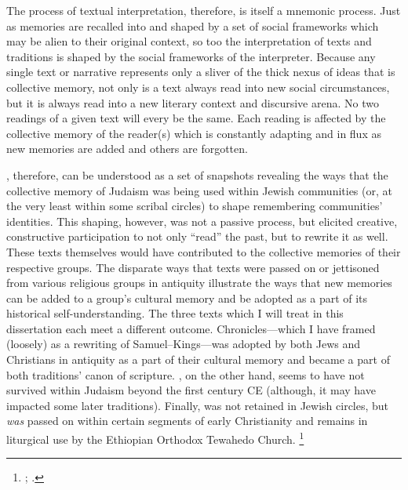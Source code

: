 The process of textual interpretation, therefore, is itself a mnemonic process. Just as memories are recalled into and shaped by a set of social frameworks which may be alien to their original context, so too the interpretation of texts and traditions is shaped by the social frameworks of the interpreter. Because any single text or narrative represents only a sliver of the thick nexus of ideas that is collective memory, not only is a text always read into new social circumstances, but it is always read into a new literary context and discursive arena. No two readings of a given text will every be the same. Each reading is affected by the collective memory of the reader(s) which is constantly adapting and in flux as new memories are added and others are forgotten.  

\RwB, therefore, can be understood as a set of snapshots revealing the ways that the collective memory of \secondtemple Judaism was being used within Jewish communities (or, at the very least within some scribal circles) to shape remembering communities' identities. This shaping, however, was not a passive process, but elicited creative, constructive participation to not only ``read'' the past, but to rewrite it as well. These texts themselves would have contributed to the collective memories of their respective groups. The disparate ways that \rwb texts were passed on or jettisoned from various religious groups in antiquity illustrate the ways that new memories can be added to a group's cultural memory and be adopted as a part of its historical self-understanding. The three texts which I will treat in this dissertation each meet a different outcome. Chronicles---which I have framed (loosely) as a rewriting of Samuel--Kings---was adopted by both Jews and Christians in antiquity as a part of their cultural memory and became a part of both traditions' canon of scripture. \GA, on the other hand, seems to have not survived within Judaism beyond the first century CE (although, it may have impacted some later traditions). Finally, \jub was not retained in Jewish circles, but \emph{was} passed on within certain segments of early Christianity and remains in liturgical use by the Ethiopian Orthodox Tewahedo Church.%
%
\footnote{\Cite{baynes_mason-etal2012}; \cite{asale_bt2016}.}

